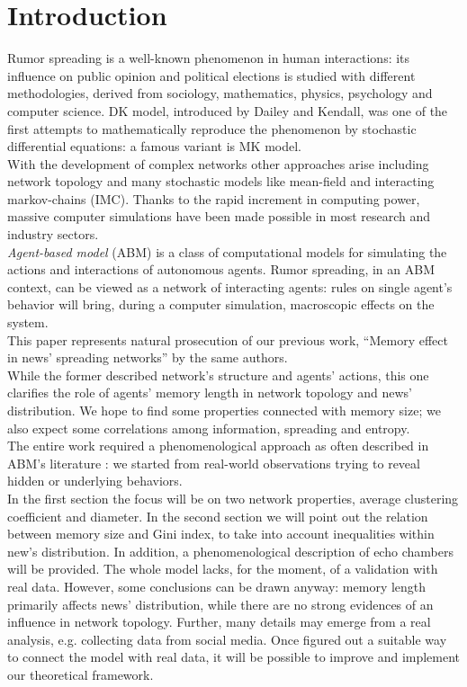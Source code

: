 \section{Introduction} \label{introduction}
Rumor spreading is a well-known phenomenon in human interactions:
its influence on public opinion\cite{publicoprumsp} and political
elections\cite{politicalrumsp} is studied with different
methodologies, derived from sociology, mathematics,
physics, psychology and computer science.
DK model,\cite{DKmodel} introduced by Dailey and Kendall, was one of
the first attempts to mathematically reproduce the phenomenon by
stochastic differential equations: a famous variant is MK
model.\cite{MKmodel}\\
With the development of complex networks other approaches arise
including network topology and many stochastic models
like mean-field\cite{meanfield} and interacting markov-chains\cite{IMC} (IMC).
Thanks to the rapid increment in computing power,
massive computer simulations have been made possible in
most research and industry sectors.\\
\textit{Agent-based model} (ABM) is a class of computational models for
simulating the actions and interactions of autonomous
agents.\cite{Agentbased}
Rumor spreading, in an ABM context, can be viewed as a network
of interacting agents: rules on single agent's behavior
will bring, during a computer simulation, macroscopic
effects on the system.\\
This paper represents natural prosecution of our previous work,
``Memory effect in news' spreading networks'' by the same
authors.\cite{ourpaper}\\
While the former described network's structure and agents' actions,
this one clarifies the role of agents' memory length in network
topology and news' distribution.
We hope to find some properties connected with memory size;
we also expect some correlations among information,
spreading and entropy.\\
The entire work required a phenomenological approach as often
described in ABM's literature
\cite{anintroduction, axtell2000agents, Helbing2012}:
we started from real-world observations trying
to reveal hidden or underlying behaviors.\\
In the first section the focus will be on two network properties,
average clustering coefficient and diameter.
In the second section we will point out the relation
between memory size and Gini index, to take into account inequalities
within new's distribution.
In addition, a phenomenological description of echo chambers
will be provided.
The whole model lacks, for the moment, of a validation with real data.
However, some conclusions can be drawn anyway: memory length
primarily affects news' distribution, while there are no strong
evidences of an influence in network topology.
Further, many details may emerge from a real analysis,
e.g. collecting data from social media.
Once figured out a suitable way to connect the model with
real data, it will be possible to improve and implement
our theoretical framework.
